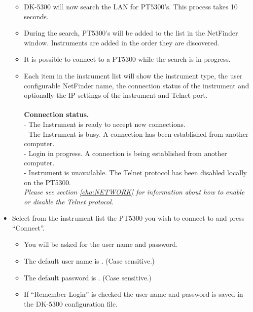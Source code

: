\begin{itemize}
	\begin{itemize}
		\item DK-5300 will now search the LAN for PT5300's. This process takes 10 seconds.
		\item During the search, PT5300's will be added to the list in the NetFinder window. Instruments are added in the order they are discovered.
		\item It is possible to connect to a PT5300 while the search is in progress.
		\item Each item in the instrument list will show the instrument type, the user configurable NetFinder name, the connection status of the instrument and optionally the IP settings of the instrument and Telnet port.\\\\
		\textbf{Connection status.}\\
					 - The Instrument is ready to accept new connections.\\
					 - The Instrument is busy. A connection has been established from another computer.\\
					 - Login in progress. A connection is being established from another computer.\\
					 - Instrument is unavailable. The Telnet protocol has been disabled locally on the PT5300.\\
					\textit{	Please see section \ref{cha:NETWORK} for information about how to enable or disable the Telnet protocol.}
	\end{itemize}
\item Select from the instrument list the PT5300 you wish to connect to and press ``Connect''.
	\begin{itemize}
		\item You will be asked for the user name and password.
		\item The default user name is \textbf{\DefaultUser}. (Case sensitive.)
		\item The default password is \textbf{\DefaultPass}. (Case sensitive.)
		\item If ``Remember Login'' is checked the user name and password is saved in the DK-5300 configuration file.


\end{itemize}
\end{itemize}
